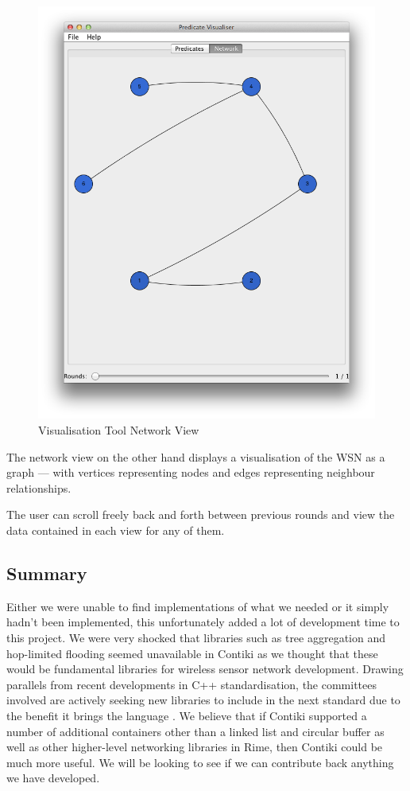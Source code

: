 \begin{figure}[H]
\centering
\includegraphics[scale=0.5]{Images/gui-network-view}
\caption{Visualisation Tool Network View}
\label{fig:netview}
\end{figure}

The network view on the other hand displays a visualisation of the WSN as a graph --- with vertices representing nodes and edges representing neighbour relationships.

The user can scroll freely back and forth between previous rounds and view the data contained in each view for any of them.

\subsection{Summary}

Either we were unable to find implementations of what we needed or it simply hadn't been implemented, this unfortunately added a lot of development time to this project. We were very shocked that libraries such as tree aggregation and hop-limited flooding seemed unavailable in Contiki as we thought that these would be fundamental libraries for wireless sensor network development. Drawing parallels from recent developments in C++ standardisation, the committees involved are actively seeking new libraries to include in the next standard due to the benefit it brings the language \cite{c++call-for-proposals}. We believe that if Contiki supported a number of additional containers other than a linked list and circular buffer as well as other higher-level networking libraries in Rime, then Contiki could be much more useful. We will be looking to see if we can contribute back anything we have developed.

